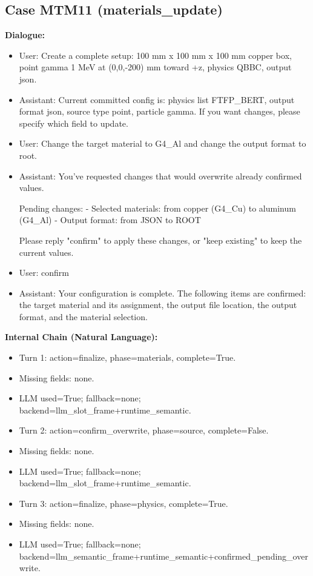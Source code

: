 \documentclass[11pt]{ctexart}
\begin{document}
\subsection{Case MTM11 (materials\_update)}
\textbf{Dialogue:}
\begin{itemize}
\item User: Create a complete setup: 100 mm x 100 mm x 100 mm copper box, point gamma 1 MeV at (0,0,-200) mm toward +z, physics QBBC, output json.
\item Assistant: Current committed config is: physics list FTFP\_BERT, output format json, source type point, particle gamma. If you want changes, please specify which field to update.
\item User: Change the target material to G4\_Al and change the output format to root.
\item Assistant: You've requested changes that would overwrite already confirmed values.

Pending changes:
- Selected materials: from copper (G4\_Cu) to aluminum (G4\_Al)
- Output format: from JSON to ROOT

Please reply "confirm" to apply these changes, or "keep existing" to keep the current values.
\item User: confirm
\item Assistant: Your configuration is complete. The following items are confirmed: the target material and its assignment, the output file location, the output format, and the material selection.
\end{itemize}
\textbf{Internal Chain (Natural Language):}
\begin{itemize}
\item Turn 1: action=finalize, phase=materials, complete=True.
\item Missing fields: none.
\item LLM used=True; fallback=none; backend=llm\_slot\_frame+runtime\_semantic.
\item Turn 2: action=confirm\_overwrite, phase=source, complete=False.
\item Missing fields: none.
\item LLM used=True; fallback=none; backend=llm\_slot\_frame+runtime\_semantic.
\item Turn 3: action=finalize, phase=physics, complete=True.
\item Missing fields: none.
\item LLM used=True; fallback=none; backend=llm\_semantic\_frame+runtime\_semantic+confirmed\_pending\_overwrite.
\end{itemize}
\end{document}
